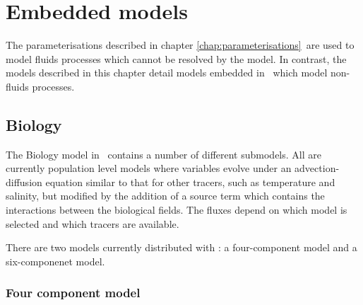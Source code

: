 \chapter{Embedded models}\label{chap:embedded}

The parameterisations described in chapter \ref{chap:parameterisations}\ are
used to model fluids processes which cannot be resolved by the model. In
contrast, the models described in this chapter detail models embedded in
\fluidity\ which model non-fluids processes.

\section{Biology}
\label{sect:biology_model}
The Biology model in \fluidity\ contains a number of different submodels. All are
currently population level models where variables evolve under an 
advection-diffusion equation similar to that for other tracers, such as 
temperature and salinity, but modified by the
addition of a source term which contains the interactions between the
biological fields. The fluxes depend on which model is selected and which
tracers are available. 

There are two models currently distributed with \fluidity: a four-component model
and a six-componenet model.

\subsection{Four component model}

